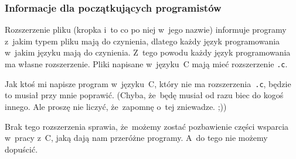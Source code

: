 \documentclass[10pt,t]{beamer}
\begin{document}
\begin{frame}
  \frametitle{Informacje dla początkujących programistów}


  Rozszerzenie pliku (kropka i~to co po niej w~jego nazwie) informuje
  programy z~jakim typem pliku mają do czynienia, dlatego każdy język
  programowania w~jakim języku mają do czynienia. Z~tego powodu każdy
  język programowania ma \alert{własne} rozszerzenie. Pliki napisane
  w~języku~C mają mieć rozszerzenie \texttt{.c}.

  Jak ktoś mi napisze program w~języku~C, który \alert{nie} ma
  rozszerzenia~\texttt{.c}, będzie to musiał przy mnie poprawić.
  (Chyba, że~będę musiał od razu biec do kogoś innego. Ale proszę nie
  liczyć, że~zapomnę o~tej zniewadze. ;))

  Brak tego rozszerzenia sprawia, że~możemy zostać pozbawienie części
  wsparcia w~pracy z~C, jaką dają nam przeróżne programy. A~do tego
  \alert{nie} możemy dopuścić.

\end{frame}
























\printbibliography





\end{document}
